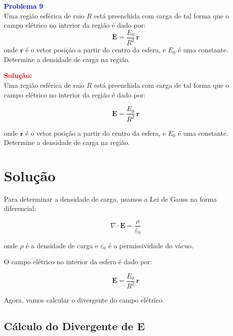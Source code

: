 \documentclass[a4paper,12pt]{article}
\begin{document}
\begin{flushleft}
\textbf{\textcolor{blue}{\Large Problema 9}}\\

Uma região esférica de raio \( R \) está preenchida com carga de tal forma que o campo elétrico no 
interior da região é dado por:
\[
\mathbf{E} = \frac{E_0}{R^2} \, \mathbf{r}
\]
onde \( \mathbf{r} \) é o vetor posição a partir do centro da esfera, e \( E_0 \) é uma constante.\\

Determine a densidade de carga na região.

\textcolor{red}{\textbf{Solução:}}\\

Uma região esférica de raio \( R \) está preenchida com carga de tal forma que o campo elétrico no interior da região é dado por:

\begin{equation}
\mathbf{E} = \frac{E_0}{R^2} \, \mathbf{r}
\end{equation}

onde \( \mathbf{r} \) é o vetor posição a partir do centro da esfera, e \( E_0 \) é uma constante. Determine a densidade de carga na região.

\section*{Solução}

Para determinar a densidade de carga, usamos a Lei de Gauss na forma diferencial:

\begin{equation}
\nabla \cdot \mathbf{E} = \frac{\rho}{\varepsilon_0}
\end{equation}

onde \( \rho \) é a densidade de carga e \( \varepsilon_0 \) é a permissividade do vácuo.

O campo elétrico no interior da esfera é dado por:

\begin{equation}
\mathbf{E} = \frac{E_0}{R^2} \, \mathbf{r}
\end{equation}

Agora, vamos calcular o divergente do campo elétrico.

\subsection*{Cálculo do Divergente de \( \mathbf{E} \)}


\end{flushleft}
\end{document}
